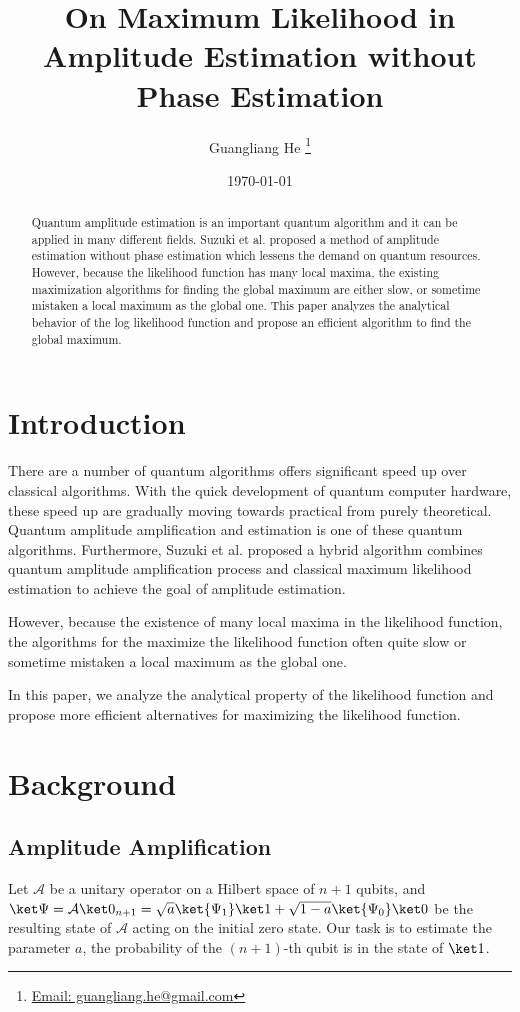 \documentclass{article}
\title{On Maximum Likelihood in Amplitude Estimation without Phase Estimation}
\author{Guangliang He
  \thanks{\href{mailto:guangliang.he@gmail.com}
    {Email: guangliang.he@gmail.com}}}
\date{\today}
\begin{document}
\maketitle

\begin{abstract}
  Quantum amplitude estimation is an important quantum algorithm
  and it can be applied in many different fields.  Suzuki et al.
  \cite{suzuki_2020} proposed a method of amplitude estimation
  without phase estimation which lessens the demand on quantum
  resources.  However, because the likelihood function has many
  local maxima, the existing maximization algorithms for finding
  the global maximum are either slow, or sometime mistaken a local
  maximum as the global one. This paper analyzes the analytical
  behavior of the log likelihood function and propose an efficient
  algorithm to find the global maximum.
\end{abstract}

\section{Introduction}
There are a number of quantum algorithms offers significant speed up
over classical algorithms.  With the quick development of quantum
computer hardware, these speed up are gradually moving towards
practical from purely theoretical. Quantum amplitude amplification
and estimation\cite{brassard_2002} is one of these quantum algorithms.
Furthermore, Suzuki et al.\cite{suzuki_2020} proposed a hybrid
algorithm combines quantum amplitude amplification process and
classical maximum likelihood estimation to achieve the goal of
amplitude estimation.

However, because the existence of many local maxima in the likelihood
function, the algorithms for the maximize the likelihood function
often quite slow or sometime mistaken a local maximum
as the global one\cite{qiskit_mlae, qiskit_aewoqft}.

In this paper, we analyze the analytical property of the likelihood
function and propose more efficient alternatives for maximizing the
likelihood function.

\section{Background}
\subsection{Amplitude Amplification}
Let $\mathcal A$ be a unitary operator on a Hilbert space of $n+1$
qubits, and $\ket\Psi = \mathcal A\ket0_{n+1}
= \sqrt{a}\ket{\Psi_1}\ket1 + \sqrt{1-a}\ket{\Psi_0}\ket0$ be
the resulting state of $\mathcal A$ acting on the initial zero state.
Our task is to estimate the parameter $a$, the probability of
the $(n+1)$-th qubit is in the state of $\ket1$.
\end{document}
